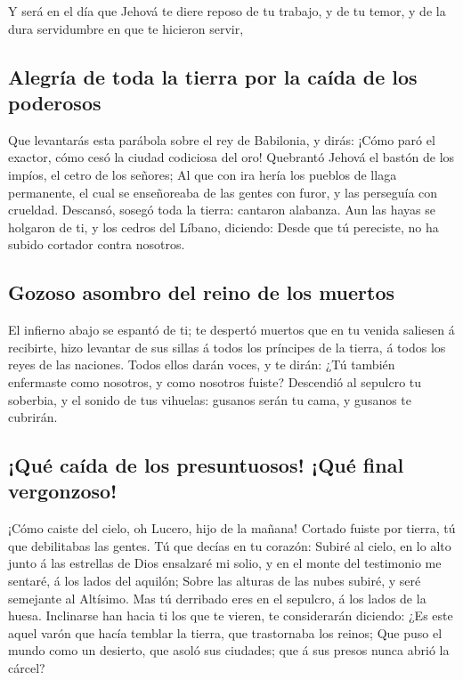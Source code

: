  Y será en el día que Jehová te diere reposo de tu trabajo,
y de tu temor, y de la dura servidumbre en que te hicieron servir,

\hypertarget{alegruxeda-de-toda-la-tierra-por-la-cauxedda-de-los-poderosos}{%
\subsection{Alegría de toda la tierra por la caída de los
poderosos}\label{alegruxeda-de-toda-la-tierra-por-la-cauxedda-de-los-poderosos}}

 Que levantarás esta parábola sobre el rey de Babilonia, y
dirás: ¡Cómo paró el exactor, cómo cesó la ciudad codiciosa del oro!
 Quebrantó Jehová el bastón de los impíos, el cetro de los
señores;  Al que con ira hería los pueblos de llaga
permanente, el cual se enseñoreaba de las gentes con furor, y las
perseguía con crueldad.  Descansó, sosegó toda la tierra:
cantaron alabanza.  Aun las hayas se holgaron de ti, y los
cedros del Líbano, diciendo: Desde que tú pereciste, no ha subido
cortador contra nosotros.

\hypertarget{gozoso-asombro-del-reino-de-los-muertos}{%
\subsection{Gozoso asombro del reino de los
muertos}\label{gozoso-asombro-del-reino-de-los-muertos}}

 El infierno abajo se espantó de ti; te despertó muertos que
en tu venida saliesen á recibirte, hizo levantar de sus sillas á todos
los príncipes de la tierra, á todos los reyes de las naciones.
 Todos ellos darán voces, y te dirán: ¿Tú también
enfermaste como nosotros, y como nosotros fuiste? 
Descendió al sepulcro tu soberbia, y el sonido de tus vihuelas: gusanos
serán tu cama, y gusanos te cubrirán.

\hypertarget{quuxe9-cauxedda-de-los-presuntuosos-quuxe9-final-vergonzoso}{%
\subsection{¡Qué caída de los presuntuosos! ¡Qué final
vergonzoso!}\label{quuxe9-cauxedda-de-los-presuntuosos-quuxe9-final-vergonzoso}}

 ¡Cómo caiste del cielo, oh Lucero, hijo de la mañana!
Cortado fuiste por tierra, tú que debilitabas las gentes. 
Tú que decías en tu corazón: Subiré al cielo, en lo alto junto á las
estrellas de Dios ensalzaré mi solio, y en el monte del testimonio me
sentaré, á los lados del aquilón;  Sobre las alturas de las
nubes subiré, y seré semejante al Altísimo.  Mas tú
derribado eres en el sepulcro, á los lados de la huesa. 
Inclinarse han hacia ti los que te vieren, te considerarán diciendo: ¿Es
este aquel varón que hacía temblar la tierra, que trastornaba los
reinos;  Que puso el mundo como un desierto, que asoló sus
ciudades; que á sus presos nunca abrió la cárcel?

